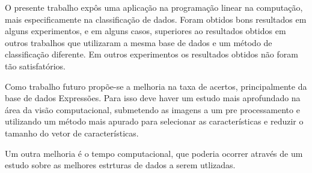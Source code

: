 O presente trabalho expôs uma aplicação na programação linear na computação, mais especificamente na classificação de dados. Foram obtidos bons resultados em alguns experimentos, e em alguns casos, superiores ao resultados obtidos em outros trabalhos que utilizaram a mesma base de dados e um método de classificação diferente. Em outros experimentos os resultados obtidos não foram tão satisfatórios.

Como trabalho futuro propõe-se a melhoria na taxa de acertos, principalmente da base de dados Expressões. Para isso deve haver um estudo mais aprofundado na área da visão computacional, submetendo as imagens a um pre processamento e utilizando um método mais apurado para selecionar as características e reduzir o tamanho do vetor de características.

Um outra melhoria é o tempo computacional, que poderia ocorrer através de um estudo sobre as melhores estrturas de dados a serem utlizadas.   

